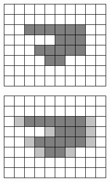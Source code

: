 \documentclass[a4paper]{article}
\begin{document}
\begin{figure}[h]
	\centering
	\begin{subfigure}[b]{0.32\textwidth}
		\centering
		\includegraphics[width=\linewidth]{poc_orig}
		\caption{}
		\label{fig:por_orig}
	\end{subfigure}
	\begin{subfigure}[b]{0.32\textwidth}
		\centering
		\includegraphics[width=\linewidth]{poc_HALF}
		\caption{}
		\label{fig:poc_HALF}
	\end{subfigure}
	\begin{subfigure}[b]{0.32\textwidth}
		\centering

\end{subfigure}
\end{figure}
\end{document}
